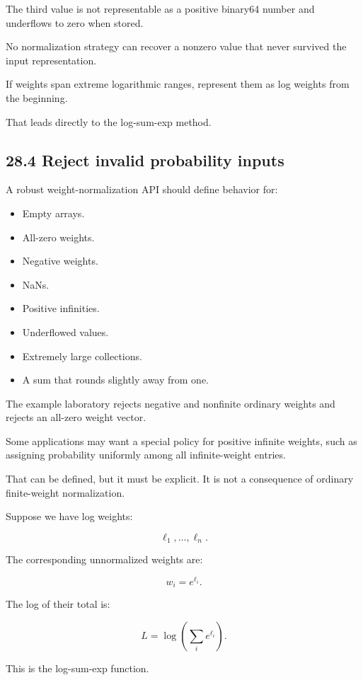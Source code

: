 The third value is not representable as a positive binary64 number and underflows to zero when stored.

No normalization strategy can recover a nonzero value that never survived the input representation.

If weights span extreme logarithmic ranges, represent them as log weights from the beginning.

That leads directly to the log-sum-exp method.

\subsection{28.4 Reject invalid probability inputs}\label{02-foundations-ii-ch031-reject-invalid-probability-inputs}

A robust weight-normalization API should define behavior for:

\begin{itemize}
\tightlist
\item
  Empty arrays.
\item
  All-zero weights.
\item
  Negative weights.
\item
  NaNs.
\item
  Positive infinities.
\item
  Underflowed values.
\item
  Extremely large collections.
\item
  A sum that rounds slightly away from one.
\end{itemize}

The example laboratory rejects negative and nonfinite ordinary weights and rejects an all-zero weight vector.

Some applications may want a special policy for positive infinite weights, such as assigning probability uniformly among all infinite-weight entries.

That can be defined, but it must be explicit. It is not a consequence of ordinary finite-weight normalization.

Suppose we have log weights:

\[ \ell_1,\ldots,\ell_n. \]

The corresponding unnormalized weights are:

\[ w_i=e^{\ell_i}. \]

The log of their total is:

\[ \boxed{ L=\log\left(\sum_ie^{\ell_i}\right) }. \]

This is the log-sum-exp function.

